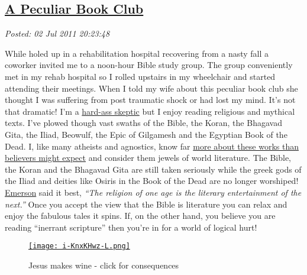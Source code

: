 %

\subsection*{\href{http://bakerjd99.wordpress.com/2011/07/02/a-peculiar-book-club/}{A Peculiar Book Club}}


\noindent\emph{Posted: 02 Jul 2011 20:23:48}
\vspace{6pt}

While holed up in a rehabilitation hospital recovering from a nasty fall
a coworker invited me to a noon-hour Bible study group. The group
conveniently met in my rehab hospital so I rolled upstairs in my
wheelchair and started attending their meetings. When I told my wife
about this peculiar book club she thought I was suffering from post
traumatic shock or had lost my mind. It's not that dramatic! I'm a
\href{http://bakerjd99.wordpress.com/2009/10/29/hard-ass-skeptic-rules/}{hard-ass
skeptic} but I enjoy reading religious and mythical texts. I've plowed
though vast swaths of the Bible, the Koran, the Bhagavad Gita, the
Iliad, Beowulf, the Epic of Gilgamesh and the Egyptian Book of the Dead.
I, like many atheists and agnostics, know far
\href{http://articles.latimes.com/2010/sep/28/nation/la-na-religion-survey-20100928}{more
about these works than believers might expect} and consider them jewels
of world literature. The Bible, the Koran and the Bhagavad Gita are
still taken seriously while the greek gods of the Iliad and deities like
Osiris in the Book of the Dead are no longer worshiped!
\href{http://www.emersoncentral.com/poems/index.htm}{Emerson} said it
best, \emph{``The religion of one age is the literary entertainment of
the next.''} Once you accept the view that the Bible is literature you
can relax and enjoy the fabulous tales it spins. If, on the other hand,
you believe you are reading ``inerrant scripture'' then you're in for a
world of logical hurt!


\captionsetup[figure]{labelformat=empty}
\begin{figure}[htbp]
\centering
\href{http://www.smbc-comics.com/index.php?db=comics\&id=1871\#comic}{\texttt{[image: i-KnxKHwz-L.png]}}
\caption{Jesus  makes wine - click for  consequences}
\label{fig:1405X0}
\end{figure}


